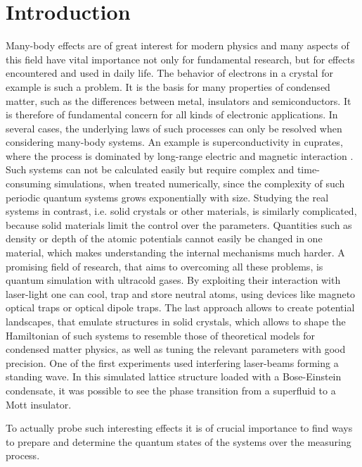 \chapter{Introduction}

Many-body effects are of great interest for modern physics and many aspects of this field have vital importance not only for fundamental research, but for effects encountered and used in daily life. The behavior of electrons in a crystal for example is such a problem. It is the basis for many properties of condensed matter, such as the differences between metal, insulators and semiconductors. It is therefore of fundamental concern for all kinds of electronic applications. In several cases, the underlying laws of such processes can only be resolved when considering many-body systems. An example is superconductivity in cuprates, where the process is dominated by long-range electric and magnetic interaction \cite{cuprates}. Such systems can not be calculated easily but require complex and time-consuming simulations, when treated numerically, since the complexity of such periodic quantum systems grows exponentially with size\cite{feynman}. Studying the real systems in contrast, i.e. solid crystals or other materials, is similarly complicated, because solid materials limit the control over the parameters. Quantities such as density or depth of the atomic potentials cannot easily be changed in one material, which makes understanding the internal mechanisms much harder. A promising field of research, that aims to overcoming all these problems, is quantum simulation with ultracold gases. By exploiting their interaction with laser-light one can cool, trap and store neutral atoms, using devices like magneto optical traps or optical dipole traps\cite{metcalf}. The last approach allows to create potential landscapes, that emulate structures in solid crystals, which allows to shape the Hamiltonian of such systems to resemble those of theoretical models for condensed matter physics, as well as tuning the relevant parameters with good precision\cite{bloch}. One of the first experiments used interfering laser-beams forming a standing wave. In this simulated lattice structure loaded with a Bose-Einstein condensate, it was possible to see the phase transition from a superfluid to a Mott insulator\cite{greiner}.

To actually probe such interesting effects it is of crucial importance to find ways to prepare and determine the quantum states of the systems over the measuring process.

